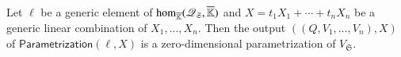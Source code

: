 \documentclass[final,1p,times,authoryear]{elsarticle}
\newcommand{\minpoly}{P}
\newcommand{\lf}{X}
\newcommand{\residueI}{\mathscr{Q}}
\newcommand{\sqfree}{Q}
\def\Kbar {{\ensuremath{\overline{\mathbb{K}}}}}
\begin{document}
\begin{lemma}
  \label{lemma:para2}
  Let $\ell$ be a generic element of ${\rm
  hom}_{\Kbar}(\residueI_\mathfrak{S},\Kbar)$ and 
 $\lf = t_1 X_1 + \cdots + t_n X_n$
 be a generic 
  linear combination of $X_1,\dots,X_n$. Then the output $((\sqfree,V_1,\dots,V_n),\lf)$ of
  $\mathsf{Parametrization}(\ell,\lf)$ is a zero-dimensional
  parametrization of $V_{\mathfrak{S}}$.
\end{lemma}


\end{document}

